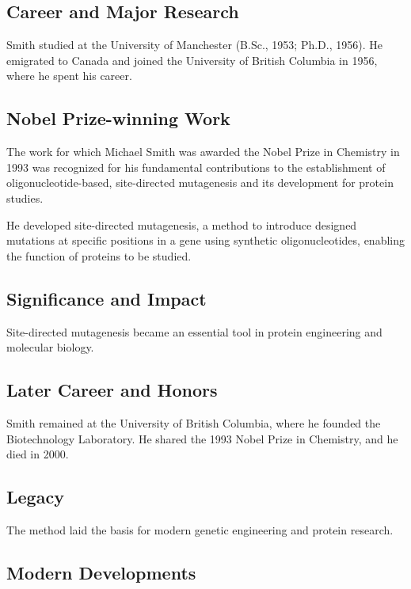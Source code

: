 \subsection*{Career and Major Research}

Smith studied at the University of Manchester (B.Sc., 1953; Ph.D., 1956). He emigrated to Canada and joined the University of British Columbia in 1956, where he spent his career.

\subsection*{Nobel Prize-winning Work}

The work for which Michael Smith was awarded the Nobel Prize in Chemistry in 1993 was recognized for his fundamental contributions to the establishment of oligonucleotide-based, site-directed mutagenesis and its development for protein studies.

He developed site-directed mutagenesis, a method to introduce designed mutations at specific positions in a gene using synthetic oligonucleotides, enabling the function of proteins to be studied.

\subsection*{Significance and Impact}

Site-directed mutagenesis became an essential tool in protein engineering and molecular biology.

\subsection*{Later Career and Honors}

Smith remained at the University of British Columbia, where he founded the Biotechnology Laboratory. He shared the 1993 Nobel Prize in Chemistry, and he died in 2000.

\subsection*{Legacy}

The method laid the basis for modern genetic engineering and protein research.

\subsection*{Modern Developments}

